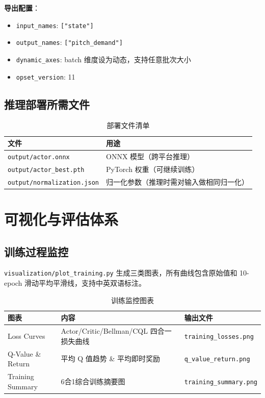 \documentclass[11pt,a4paper]{ctexart}
\newcommand{\file}[1]{\texttt{#1}}
\newcommand{\code}[1]{\texttt{#1}}
\begin{document}
\textbf{导出配置}：
\begin{itemize}
    \item \texttt{input\_names}: \code{["state"]}
    \item \texttt{output\_names}: \code{["pitch\_demand"]}
    \item \texttt{dynamic\_axes}: batch 维度设为动态，支持任意批次大小
    \item \texttt{opset\_version}: 11
\end{itemize}

\subsection{推理部署所需文件}

\begin{table}[H]
\centering
\caption{部署文件清单}
\begin{tabular}{ll}
\toprule
\textbf{文件} & \textbf{用途} \\
\midrule
\file{output/actor.onnx}        & ONNX 模型（跨平台推理） \\
\file{output/actor\_best.pth}   & PyTorch 权重（可继续训练） \\
\file{output/normalization.json}& 归一化参数（推理时需对输入做相同归一化） \\
\bottomrule
\end{tabular}
\end{table}

\newpage

\section{可视化与评估体系}

\subsection{训练过程监控}

\file{visualization/plot\_training.py} 生成三类图表，所有曲线包含原始值和 10-epoch 滑动平均平滑线，支持中英双语标注。

\begin{table}[H]
\centering
\caption{训练监控图表}
\begin{tabular}{lll}
\toprule
\textbf{图表} & \textbf{内容} & \textbf{输出文件} \\
\midrule
Loss Curves      & Actor/Critic/Bellman/CQL 四合一损失曲线 & \file{training\_losses.png} \\
Q-Value \& Return & 平均 Q 值趋势 \& 平均即时奖励          & \file{q\_value\_return.png} \\
Training Summary & 6合1综合训练摘要图                       & \file{training\_summary.png} \\
\bottomrule
\end{tabular}
\end{table}
\end{document}
